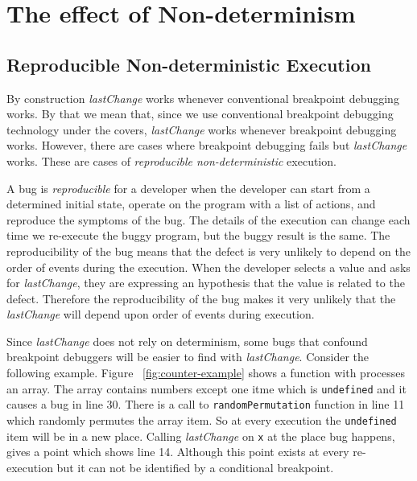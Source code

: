 \documentclass[preprint]{sigplanconf}
\begin{document}

\section{The effect of Non-determinism}  %
\subsection{Reproducible Non-deterministic Execution}

By construction \textit{lastChange} works whenever conventional
breakpoint debugging works. By that we mean that, since we use
conventional breakpoint debugging technology under the covers,
\textit{lastChange} works whenever breakpoint debugging
works. However, there are cases where breakpoint debugging fails but
\textit{lastChange} works.  These are cases of \textit{reproducible
  non-deterministic} execution.

A bug is \textit{reproducible} for a developer when the developer can
start from a determined initial state, operate on the program with a
list of actions, and reproduce the symptoms of the bug. The details of
the execution can change each time we re-execute the buggy program,
but the buggy result is the same.  The reproducibility of the bug
means that the defect is very unlikely to depend on the order of
events during the execution. When the developer selects a value and
asks for \textit{lastChange}, they are expressing an hypothesis that
the value is related to the defect. Therefore the reproducibility of
the bug makes it very unlikely that the \textit{lastChange} will
depend upon order of events during execution.

Since \textit{lastChange} does not rely on determinism, some bugs that
confound breakpoint debuggers will be easier to find with
\textit{lastChange}.  Consider the following example.
Figure ~\ref{fig:counter-example} shows a function with processes an
array. The array contains numbers except one itme which is
\texttt{undefined} and it causes a bug in line 30. There is a call to
\texttt{randomPermutation} function in line 11 which randomly
permutes the array item. So at every execution the
\texttt{undefined} item will be in a new place. Calling
\textit{lastChange} on \texttt{x} at the place bug happens, gives a
point which shows line 14. Although this point exists at every
re-execution but it can not be identified by a conditional breakpoint.
\end{document}
